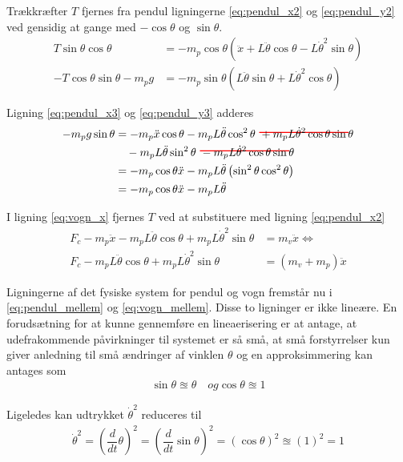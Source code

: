 Trækkræfter $T$ fjernes fra pendul ligningerne \ref{eq:pendul_x2} og \ref{eq:pendul_y2} ved gensidig at gange med $-\cos{\theta}$ og $\sin{\theta}$. 
\begin{align}
T\sin{\theta}\cos{\theta} &=   -m_p \cos{\theta} \left( \ddot{x} + L\ddot{\theta}\cos{\theta} - L\dot{\theta}^2\sin{\theta} \right) \label{eq:pendul_x3} \\
-T\cos{\theta}\sin{\theta} - m_p g &=  -m_p \sin{\theta} \left( L\ddot{\theta}\sin{\theta} + L\dot{\theta}^2\cos{\theta}\right) \label{eq:pendul_y3}
\end{align}

Ligning \ref{eq:pendul_x3} og \ref{eq:pendul_y3} adderes
\begin{align}
-m_p g \sin{\theta}    &= - m_p \ddot{x}\cos{\theta}
						- m_p L\ddot{\theta}\cos^2\theta\
						\hcancel[red]{+ m_p L \dot{\theta}^2\cos{\theta}\sin{\theta}}\\
					   &\quad - m_p L\ddot{\theta}\sin^2\theta\
					    \hcancel[red]{- m_p L \dot{\theta}^2\cos{\theta}\sin{\theta}} \\
					   &=- m_p \cos{\theta}\ddot{x} - m_p L \ddot{\theta} \left(\sin^2 \theta \cos^2 \theta \right) \\
					   &=- m_p \cos{\theta}\ddot{x} - m_p L \ddot{\theta} \label{eq:pendul_mellem}
\end{align}

I ligning \ref{eq:vogn_x} fjernes $T$ ved at substituere med ligning \ref{eq:pendul_x2}
\begin{align}
F_c - m_p \ddot{x} - m_p L\ddot{\theta}\cos{\theta} + m_p L\dot{\theta}^2\sin{\theta} &= m_v \ddot{x} \Leftrightarrow \\
F_c - m_p L\ddot{\theta}\cos{\theta} + m_p L\dot{\theta}^2\sin{\theta} &= (m_v + m_p)  \ddot{x} \label{eq:vogn_mellem}
\end{align}

Ligningerne af det fysiske system for pendul og vogn fremstår nu i \ref{eq:pendul_mellem} og \ref{eq:vogn_mellem}. Disse to ligninger er ikke lineære. En forudsætning for at kunne gennemføre en lineaerisering er at antage, at udefrakommende påvirkninger til systemet er så små, at små forstyrrelser kun giver anledning til små ændringer af vinklen $\theta$ og en approksimmering kan antages som
\begin{align}
\sin{\theta} \approxeq \theta \quad og \cos{\theta} \approxeq 1
\end{align} 

Ligeledes kan udtrykket $\dot{\theta}^2$ reduceres til
\begin{align}
\dot{\theta}^2 = \left( \dfrac{d}{dt}\theta \right)^2 =  \left( \dfrac{d}{dt}\sin{\theta} \right)^2 = \left(\cos{\theta}\right)^2 \approxeq (1)^2 = 1
\end{align}

